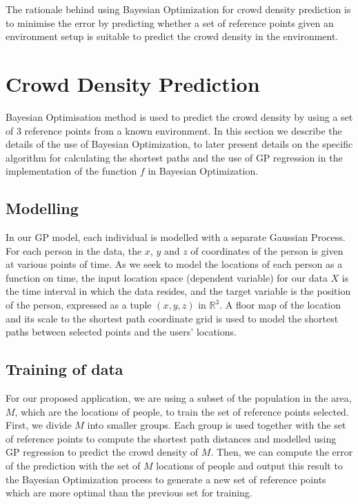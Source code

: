 \documentclass[letterpaper]{article}
\begin{document}
The rationale behind using Bayesian Optimization for crowd density prediction is to minimise the error by predicting whether a set of reference points given an environment setup is suitable to predict the crowd density in the environment.

\section{Crowd Density Prediction}

Bayesian Optimisation method is used to predict the crowd density by using a set of $3$ reference points from a known environment. In this section we describe the details of the use of Bayesian Optimization, to later present details on the specific algorithm for calculating the shortest paths and the use of GP regression in the implementation of the function $f$ in Bayesian Optimization.

\subsection{Modelling}
In our GP model, each individual is modelled with a separate Gaussian Process. For each person in the data, the $x$, $y$ and $z$ of coordinates of the person is given at various points of time. As we seek to model the locations of each person as a function on time, the input location space (dependent variable) for our data $X$ is the time interval in which the data resides, and the target variable is the position of the person, expressed as a tuple $(x,y,z)$ in $\mathbb{R}^3$. A floor map of the location and its scale to the shortest path coordinate grid is used to model the shortest paths between selected points and the users' locations.

\subsection{Training of data}

For our proposed application, we are using a subset of the population in the area, $M$, which are the locations of people, to train the set of reference points selected. First, we divide $M$ into smaller groups. Each group is used together with the set of reference points to compute the shortest path distances and modelled using GP regression to predict the crowd density of $M$. Then, we can compute the error of the prediction with the set of $M$ locations of people and output this result to the Bayesian Optimization process to generate a new set of reference points which are more optimal than the previous set for training.
\end{document}
